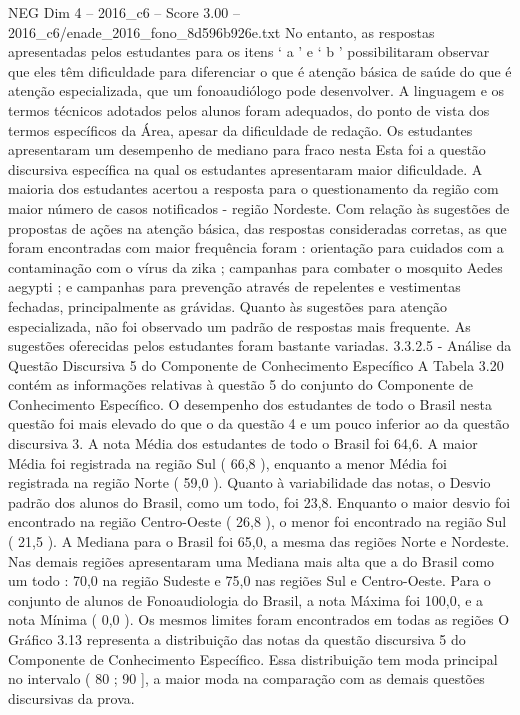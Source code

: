 \begin{textsample}{NEG Dim 4 – 2016\_c6 – Score 3.00 – 2016\_c6/enade\_2016\_fono\_8d596b926e.txt}
No entanto, as respostas apresentadas pelos estudantes para os itens ‘ a ’ e ‘ b ’ possibilitaram observar que eles têm dificuldade para diferenciar o que é atenção básica de saúde do que é atenção especializada, que um fonoaudiólogo pode desenvolver.
A linguagem e os termos técnicos adotados pelos alunos foram adequados, do ponto de vista dos termos específicos da Área, apesar da dificuldade de redação.
Os estudantes apresentaram um desempenho de mediano para fraco nesta Esta foi a questão discursiva específica na qual os estudantes apresentaram maior dificuldade.
A maioria dos estudantes acertou a resposta para o questionamento da região com maior número de casos notificados - região Nordeste.
Com relação às sugestões de propostas de ações na atenção básica, das respostas consideradas corretas, as que foram encontradas com maior frequência foram : orientação para cuidados com a contaminação com o vírus da zika ; campanhas para combater o mosquito Aedes aegypti ; e campanhas para prevenção através de repelentes e vestimentas fechadas, principalmente as grávidas.
Quanto às sugestões para atenção especializada, não foi observado um padrão de respostas mais frequente.
As sugestões oferecidas pelos estudantes foram bastante variadas. 3.3.2.5 - Análise da Questão Discursiva 5 do Componente de Conhecimento Específico A Tabela 3.20 contém as informações relativas à questão 5 do conjunto do Componente de Conhecimento Específico.
O desempenho dos estudantes de todo o Brasil nesta questão foi mais elevado do que o da questão 4 e um pouco inferior ao da questão discursiva 3.
A nota Média dos estudantes de todo o Brasil foi 64,6.
A maior Média foi registrada na região Sul ( 66,8 ), enquanto a menor Média foi registrada na região Norte ( 59,0 ).
Quanto à variabilidade das notas, o Desvio padrão dos alunos do Brasil, como um todo, foi 23,8.
Enquanto o maior desvio foi encontrado na região Centro-Oeste ( 26,8 ), o menor foi encontrado na região Sul ( 21,5 ).
A Mediana para o Brasil foi 65,0, a mesma das regiões Norte e Nordeste.
Nas demais regiões apresentaram uma Mediana mais alta que a do Brasil como um todo : 70,0 na região Sudeste e 75,0 nas regiões Sul e Centro-Oeste.
Para o conjunto de alunos de Fonoaudiologia do Brasil, a nota Máxima foi 100,0, e a nota Mínima ( 0,0 ).
Os mesmos limites foram encontrados em todas as regiões O Gráfico 3.13 representa a distribuição das notas da questão discursiva 5 do Componente de Conhecimento Específico.
Essa distribuição tem moda principal no intervalo ( 80 ; 90 ], a maior moda na comparação com as demais questões discursivas da prova.

\end{textsample}
